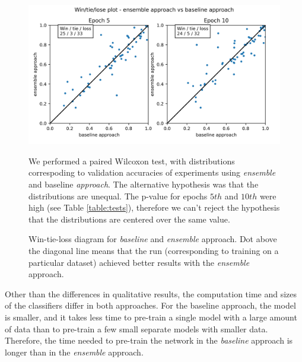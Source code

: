 \documentclass[a4paper,11pt,twoside]{report}
\theoremstyle{definition}
\begin{document}
\FloatBarrier
\begin{figure}[h!t]
\centering
\includegraphics[width=17cm]{imgs/baseline_vs_ensemble/win_tie_lose_epoch.png}
\caption{Win-tie-loss diagram  for\textit{ baseline } and\textit{ ensemble }approach. Dot above the diagonal line means that the run (corresponding to training on a particular dataset)  achieved better results with the \textit{ensemble} approach.}
We performed a paired Wilcoxon test, with distributions correspoding to  validation accuracies of experiments using \textit{ensemble} and baseline \textit{approach}. The alternative hypothesis was that the distributions are unequal. The p-value for epochs $5th$ and $10th$ were high (see Table \ref{table:tests}), therefore we can't reject the hypothesis that the distributions are centered over the same value.
\label{fig:win_tie_loss_baseline_vs_ensemble}
\end{figure}
\FloatBarrier

Other than the differences in qualitative results, the computation time and sizes of the classifiers differ in both approaches.
For the baseline approach, the model is smaller, and it takes less time to pre-train a single model with a large amount of data than to pre-train a few small separate models with smaller data. Therefore, the time needed to pre-train the network in the \textit{baseline} approach is longer than in the \textit{ensemble} approach.
\end{document}
